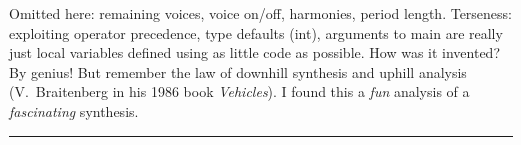 \smallskip
{}
\smallskip\noindent
Omitted here: remaining voices, voice on/off, harmonies, period length.
Terseness: exploiting operator precedence, type defaults (int),
arguments to main are really just local variables defined using
as little code as possible.
How was it invented? By genius!
But remember the law of downhill synthesis and uphill analysis
(V.~Braitenberg in his 1986 book {\sl Vehicles\/}).
I found this a {\it fun\/} analysis of a {\it fascinating\/} synthesis.
\smallskip\hrule

\bye
